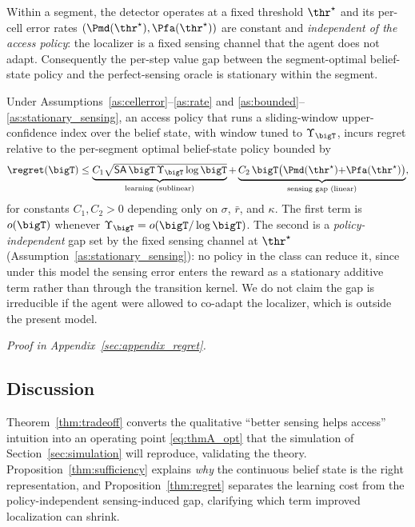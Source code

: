 \begin{assumption}
\label{as:stationary_sensing}
Within a segment, the detector operates at a fixed threshold $\thr^\star$ and
its per-cell error rates $(\Pmd(\thr^\star),\Pfa(\thr^\star))$ are constant
and \emph{independent of the access policy}: the localizer is a fixed sensing
channel that the agent does not adapt. Consequently the per-step value gap
between the segment-optimal belief-state policy and the perfect-sensing
oracle is stationary within the segment.
\end{assumption}

\begin{proposition}
\label{thm:regret}
Under Assumptions~\ref{as:cellerror}--\ref{as:rate} and
\ref{as:bounded}--\ref{as:stationary_sensing}, an access policy that runs a
sliding-window upper-confidence index over the belief state, with window
tuned to $\Upsilon_{\bigT}$, incurs regret relative to the per-segment
optimal belief-state policy bounded by
\begin{equation}
\regret(\bigT)\le
\underbrace{C_1\sqrt{\mathsf{SA}\,\bigT\,\Upsilon_{\bigT}\log\bigT}}
_{\text{learning (sublinear)}}
+
\underbrace{C_2\,\bigT\big(\Pmd(\thr^{\star}){+}\Pfa(\thr^{\star})\big)}
_{\text{sensing gap (linear)}},
\label{eq:thmC}
\end{equation}
for constants $C_1,C_2>0$ depending only on $\sigma$, $\bar r$, and $\kappa$.
The first term is $o(\bigT)$ whenever $\Upsilon_{\bigT}=o(\bigT/\log\bigT)$.
The second is a \emph{policy-independent} gap set by the fixed sensing channel
at $\thr^\star$ (Assumption~\ref{as:stationary_sensing}): no policy in the
class can reduce it, since under this model the sensing error enters the
reward as a stationary additive term rather than through the transition
kernel. We do not claim the gap is irreducible if the agent were allowed to
co-adapt the localizer, which is outside the present model.
\end{proposition}
\noindent\emph{Proof in Appendix~\ref{sec:appendix_regret}.}

\subsection{Discussion}
\label{subsec:theory_discussion}
Theorem~\ref{thm:tradeoff} converts the qualitative ``better sensing helps
access'' intuition into an operating point \eqref{eq:thmA_opt} that the
simulation of Section~\ref{sec:simulation} will reproduce, validating the
theory. Proposition~\ref{thm:sufficiency} explains \emph{why} the continuous
belief state is the right representation, and Proposition~\ref{thm:regret}
separates the learning cost from the policy-independent sensing-induced gap,
clarifying which term improved localization can shrink.
